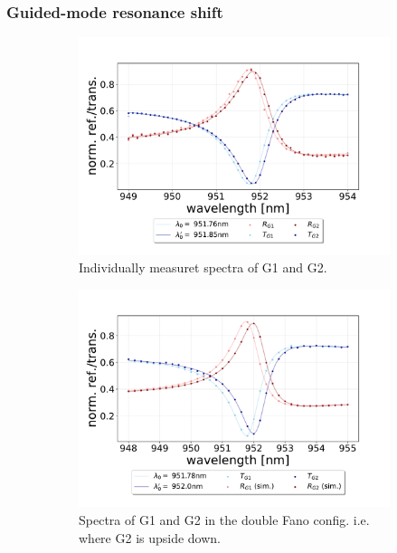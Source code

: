 \subsubsection{Guided-mode resonance shift}

\begin{figure}[h!]
    \centering
    \begin{subfigure}[b]{0.49\textwidth}
        \includegraphics[width=\textwidth]{figures/results/M3:M5/M3:M5_initial_spectra.pdf}
        \caption{Individually measuret spectra of G1 and G2.}
        \label{fig:G1_and_G2_initial_discussion}
    \end{subfigure}
    \begin{subfigure}[b]{0.49\textwidth}
        \includegraphics[width=\textwidth]{figures/results/M3:M5/M3:M5_spectra_at_measurement.pdf}
        \caption{Spectra of G1 and G2 in the double Fano config. i.e. where G2 is upside down.}
        \label{fig:G1_and_G2_double_fano_config_discussion}
    \end{subfigure}
    \caption{}
    \label{fig:G1_and_G2_spectra_individual_and_in_double_fano_config}
\end{figure}

